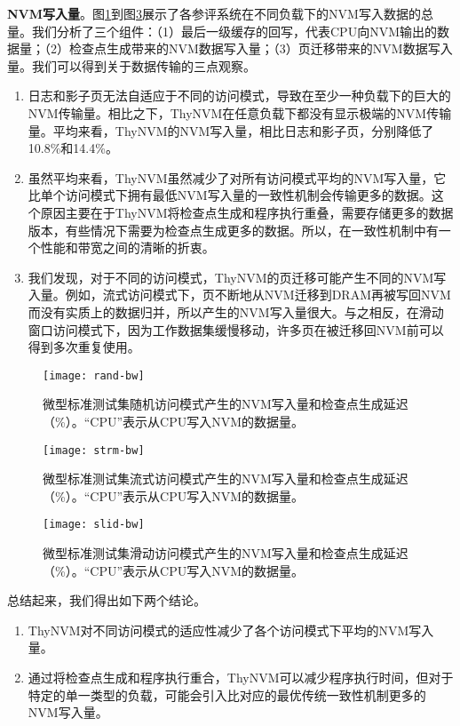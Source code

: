 \textbf{NVM写入量}。图\ref{fig:rand-bw}到图\ref{fig:slid-bw}展示了各参评系统在不同负载下的NVM写入数据的总量。我们分析了三个组件：（1）最后一级缓存的回写，代表CPU向NVM输出的数据量；（2）检查点生成带来的NVM数据写入量；（3）页迁移带来的NVM数据写入量。我们可以得到关于数据传输的三点观察。
\begin{enumerate}
\item 日志和影子页无法自适应于不同的访问模式，导致在至少一种负载下的巨大的NVM传输量。相比之下，ThyNVM在任意负载下都没有显示极端的NVM传输量。平均来看，ThyNVM的NVM写入量，相比日志和影子页，分别降低了10.8\%和14.4\%。
\item 虽然平均来看，ThyNVM虽然减少了对所有访问模式平均的NVM写入量，它比单个访问模式下拥有最低NVM写入量的一致性机制会传输更多的数据。这个原因主要在于ThyNVM将检查点生成和程序执行重叠，需要存储更多的数据版本，有些情况下需要为检查点生成更多的数据。所以，在一致性机制中有一个性能和带宽之间的清晰的折衷。
\item 我们发现，对于不同的访问模式，ThyNVM的页迁移可能产生不同的NVM写入量。例如，流式访问模式下，页不断地从NVM迁移到DRAM再被写回NVM而没有实质上的数据归并，所以产生的NVM写入量很大。与之相反，在滑动窗口访问模式下，因为工作数据集缓慢移动，许多页在被迁移回NVM前可以得到多次重复使用。 
\end{enumerate}

\begin{figure}[!h]
\centering
\texttt{[image: rand-bw]}\\
\caption{微型标准测试集随机访问模式产生的NVM写入量和检查点生成延迟（\%）。``CPU''表示从CPU写入NVM的数据量。}
\label{fig:rand-bw}
\end{figure}

\begin{figure}[!h]
\centering
\texttt{[image: strm-bw]}\\
\caption{微型标准测试集流式访问模式产生的NVM写入量和检查点生成延迟（\%）。``CPU''表示从CPU写入NVM的数据量。}
\label{fig:strm-bw}
\end{figure}

\begin{figure}[!h]
\centering
\texttt{[image: slid-bw]}\\
\caption{微型标准测试集滑动访问模式产生的NVM写入量和检查点生成延迟（\%）。``CPU''表示从CPU写入NVM的数据量。}
\label{fig:slid-bw}
\end{figure}

总结起来，我们得出如下两个结论。
\begin{enumerate}
\item ThyNVM对不同访问模式的适应性减少了各个访问模式下平均的NVM写入量。 
\item 通过将检查点生成和程序执行重合，ThyNVM可以减少程序执行时间，但对于特定的单一类型的负载，可能会引入比对应的最优传统一致性机制更多的NVM写入量。
\end{enumerate}


